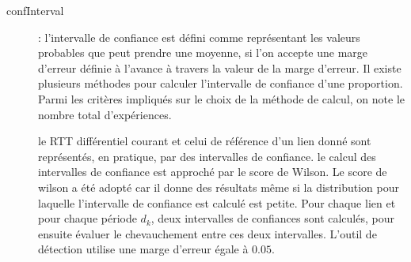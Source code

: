\begin{description}
\item[confInterval] : l'intervalle de confiance  est défini comme représentant les valeurs probables que peut prendre une moyenne, si l'on accepte une marge d'erreur définie à l'avance à travers la valeur de la marge d'erreur. Il existe plusieurs méthodes pour calculer l'intervalle de confiance d'une proportion. Parmi les critères impliqués sur le choix de la méthode de calcul, on note le nombre total d'expériences.

le RTT différentiel courant et  celui de référence d'un lien donné sont représentés, en pratique, par des intervalles de confiance.  le calcul des intervalles de confiance  est approché par le score de Wilson. Le score de wilson a été adopté car il donne des résultats même si la distribution pour laquelle l'intervalle de confiance est calculé est petite. Pour chaque lien et pour chaque période $d_k$,  deux intervalles de confiances sont calculés, pour ensuite évaluer le chevauchement entre ces deux intervalles. L'outil de détection utilise une marge d'erreur égale à  $ 0.05 $.





\end{description}
